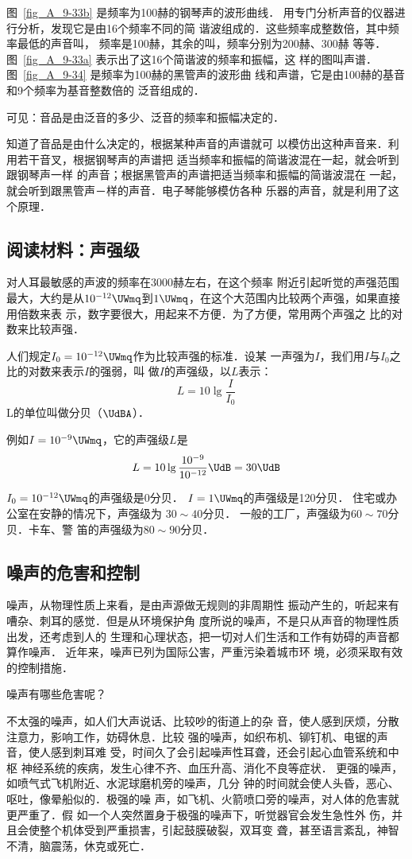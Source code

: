 图~\ref{fig_A_9-33b} 是频率为100赫的钢琴声的波形曲线．
用专门分析声音的仪器进行分析，发现它是由16个频率不同的简
谐波组成的．这些频率成整数倍，其中频率最低的声音叫，
频率是100赫，其余的叫，频率分别为200赫、300赫
等等．图~\ref{fig_A_9-33a} 表示出了这16个简谐波的频率和振幅，这
样的图叫声谱．
图~\ref{fig_A_9-34} 是频率为100赫的黑管声的波形曲
线和声谱，它是由100赫的基音和9个频率为基音整数倍的
泛音组成的．

可见：音品是由泛音的多少、泛音的频率和振幅决定的．

知道了音品是由什么决定的，根据某种声音的声谱就可
以模仿出这种声音来．利用若干音叉，根据钢琴声的声谱把
适当频率和振幅的简谐波混在一起，就会听到跟钢琴声一样
的声音；根据黑管声的声谱把适当频率和振幅的简谐波混在
一起，就会听到跟黑管声－样的声音．电子琴能够模仿各种
乐器的声音，就是利用了这个原理．


\subsection*{阅读材料：声强级}
对人耳最敏感的声波的频率在3000赫左右，在这个频率
附近引起听觉的声强范围最大，大约是从$10^{-12} \UWmq $到$1 \UWmq $，在这个大范围内比较两个声强，如果直接用倍数来表
示，数字要很大，用起来不方便．为了方便，常用两个声强之
比的对数来比较声强．

人们规定$I_0=10^{-12} \UWmq $作为比较声强的标准．设某
一声强为$I$，我们用$I$与$I_0$之比的对数来表示$I$的强弱，叫
做$I$的声强级，以$L$表示：
\[L=10\lg \frac{I}{I_0} \]
L的单位叫做分贝（$\UdBA$）．

例如$I=10^{-9} \UWmq $，它的声强级$L$是
\[L=10\lg \frac{10^{-9}}{10^{-12}} \UdB=30 \UdB \]

$I_0=10^{-12} \UWmq $的声强级是0分贝．
$I=1 \UWmq $的声强级是120分贝．
住宅或办公室在安静的情况下，声强级为
$30\sim 40$分贝．
一般的工厂，声强级为$60\sim 70$分贝．卡车、警
笛的声强级为$80\sim 90$分贝．

\subsection{噪声的危害和控制}
噪声，从物理性质上来看，是由声源做无规则的非周期性
振动产生的，听起来有嘈杂、刺耳的感觉．但是从环境保护角
度所说的噪声，不是只从声音的物理性质出发，还考虑到人的
生理和心理状态，把一切对人们生活和工作有妨碍的声音都
算作噪声．
近年来，噪声已列为国际公害，严重污染着城市环
境，必须采取有效的控制措施．

噪声有哪些危害呢？

不太强的噪声，如人们大声说话、比较吵的街道上的杂
音，使人感到厌烦，分散注意力，影响工作，妨碍休息．比较
强的噪声，如织布机、铆钉机、电锯的声音，使人感到刺耳难
受，时间久了会引起噪声性耳聋，还会引起心血管系统和中枢
神经系统的疾病，发生心律不齐、血压升高、消化不良等症状．
更强的噪声，如喷气式飞机附近、水泥球磨机旁的噪声，几分
钟的时间就会使人头昏，恶心、呕吐，像晕船似的．极强的噪
声，如飞机、火箭喷口旁的噪声，对人体的危害就更严重了．假
如一个人突然置身于极强的噪声下，听觉器官会发生急性外
伤，并且会使整个机体受到严重损害，引起鼓膜破裂，双耳变
聋，甚至语言紊乱，神智不清，脑震荡，休克或死亡．

